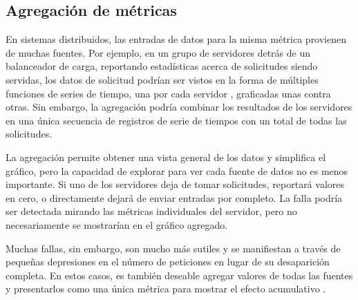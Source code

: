 \subsection*{Agregación de métricas}
\label{agregacion_de_metricas}

En sistemas distribuidos, las entradas de datos para la misma métrica provienen
de muchas fuentes. Por ejemplo, en un grupo de servidores  detrás
de un balanceador de carga, reportando estadísticas acerca de solicitudes
siendo servidas, los datos de solicitud podrían ser vistos en la forma de
múltiples funciones de series de tiempo, una por cada servidor ,
graficadas unas contra otras. Sin embargo, la agregación podría combinar los
resultados de los servidores  en una única secuencia de registros
de serie de tiempos con un total de todas las solicitudes.

La agregación permite obtener una vista general de los datos y simplifica el
gráfico, pero la capacidad de explorar para ver cada fuente de datos no es
menos importante. Si  uno de los servidores deja de tomar solicitudes,
reportará valores en cero, o directamente dejará de enviar entradas por
completo. La falla podría ser detectada mirando las métricas individuales del
servidor, pero no necesariamente se mostrarían en el gráfico agregado.

Muchas fallas, sin embargo, son mucho más sutiles y se manifiestan a través de
pequeñas depresiones en el número de peticiones en lugar de su desaparición
completa. En estos casos, es también deseable agregar valores de todas las
fuentes y presentarlos como una única métrica para mostrar el efecto
acumulativo \cite[p.~21-25]{monitoreo:efective_monitoring_and_alerting}.

